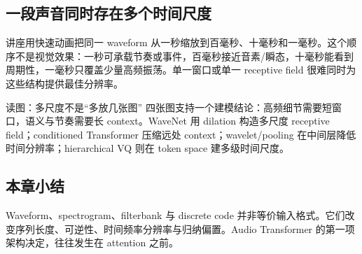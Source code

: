 \subsection{一段声音同时存在多个时间尺度}

讲座用快速动画把同一 waveform 从一秒缩放到百毫秒、十毫秒和一毫秒。这个顺序不是视觉效果：一秒可承载节奏或事件，百毫秒接近音素/瞬态，十毫秒能看到周期性，一毫秒只覆盖少量高频振荡。单一窗口或单一 receptive field 很难同时为这些结构提供最佳分辨率。





\begin{knowledgebox}{读图：多尺度不是“多放几张图”}
四张图支持一个建模结论：高频细节需要短窗口，语义与节奏需要长 context。WaveNet 用 dilation 构造多尺度 receptive field；conditioned Transformer 压缩远处 context；wavelet/pooling 在中间层降低时间分辨率；hierarchical VQ 则在 token space 建多级时间尺度。
\end{knowledgebox}


\subsection{本章小结}

Waveform、spectrogram、filterbank 与 discrete code 并非等价输入格式。它们改变序列长度、可逆性、时间频率分辨率与归纳偏置。Audio Transformer 的第一项架构决定，往往发生在 attention 之前。

